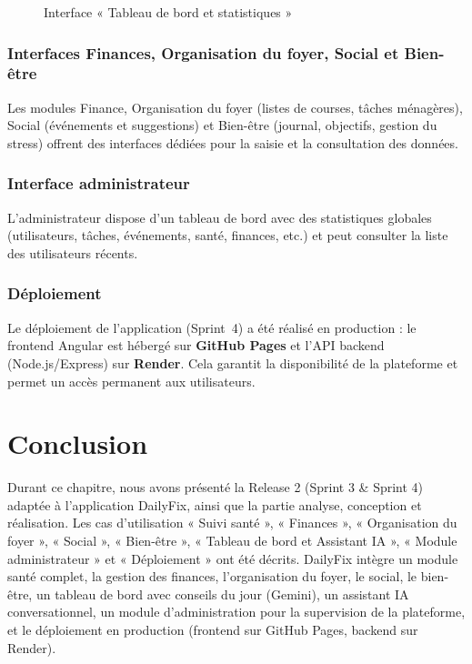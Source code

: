 \begin{figure}[H]
\centering
\caption{Interface « Tableau de bord et statistiques »}
\label{fig:dashboard}
\end{figure}

\subsubsection{Interfaces Finances, Organisation du foyer, Social et Bien-être}

Les modules Finance, Organisation du foyer (listes de courses, tâches ménagères), Social (événements et suggestions) et Bien-être (journal, objectifs, gestion du stress) offrent des interfaces dédiées pour la saisie et la consultation des données.

\subsubsection{Interface administrateur}

L'administrateur dispose d'un tableau de bord avec des statistiques globales (utilisateurs, tâches, événements, santé, finances, etc.) et peut consulter la liste des utilisateurs récents.

\subsubsection{Déploiement}

Le déploiement de l'application (Sprint~4) a été réalisé en production : le frontend Angular est hébergé sur \textbf{GitHub Pages} et l'API backend (Node.js/Express) sur \textbf{Render}. Cela garantit la disponibilité de la plateforme et permet un accès permanent aux utilisateurs.

\section{Conclusion}

Durant ce chapitre, nous avons présenté la Release 2 (Sprint 3 \& Sprint 4) adaptée à l'application DailyFix, ainsi que la partie analyse, conception et réalisation. Les cas d'utilisation « Suivi santé », « Finances », « Organisation du foyer », « Social », « Bien-être », « Tableau de bord et Assistant IA », « Module administrateur » et « Déploiement » ont été décrits. DailyFix intègre un module santé complet, la gestion des finances, l'organisation du foyer, le social, le bien-être, un tableau de bord avec conseils du jour (Gemini), un assistant IA conversationnel, un module d'administration pour la supervision de la plateforme, et le déploiement en production (frontend sur GitHub Pages, backend sur Render).
